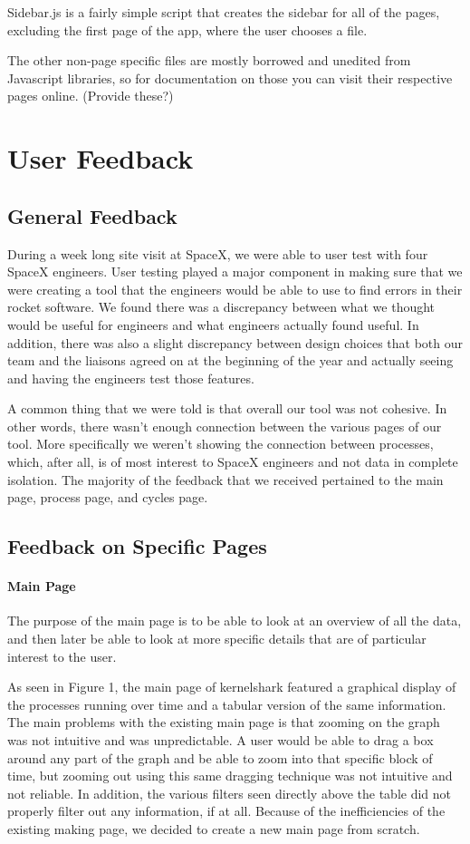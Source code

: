 \documentclass{hmcclinic}
\begin{document}
  Sidebar.js is a fairly simple script that creates the sidebar for all of the
  pages, excluding the first page of the app, where the user chooses a file.

  The other non-page specific files are mostly borrowed and unedited from
  Javascript libraries, so for documentation on those you can visit their
  respective pages online. (Provide these?)

\chapter{User Feedback} %
\section{General Feedback} %
During a week long site visit at SpaceX, we were able to user test with four SpaceX engineers. User testing played a major component in making sure that we were creating a tool that the engineers would be able to use to find errors in their rocket software. We found there was a discrepancy between what we thought would be useful for engineers and what engineers actually found useful. In addition, there was also a slight discrepancy between design choices that both our team and the liaisons agreed on at the beginning of the year and actually seeing and having the engineers test those features.

A common thing that we were told is that overall our tool was not cohesive. In other words, there wasn't enough connection between the various pages of our tool. More specifically we weren't showing the connection between processes, which, after all, is of most interest to SpaceX engineers and not data in complete isolation. The majority of the feedback that we received pertained to the main page, process page, and cycles page.

\section{Feedback on Specific Pages} %

\subsubsection{Main Page}
The purpose of the main page is to be able to look at an overview of all the data, and then later be able to look at more specific details that are of particular interest to the user.

As seen in Figure 1, the main page of kernelshark featured a graphical display of the processes running over time and a tabular version of the same information. The main problems with the existing main page is that zooming on the graph was not intuitive and was unpredictable. A user would be able to drag a box around any part of the graph and be able to zoom into that specific block of time, but zooming out using this same dragging technique was not intuitive and not reliable. In addition, the various filters seen directly above the table did not properly filter out any information, if at all. Because of the inefficiencies of the existing making page, we decided to create a new main page from scratch. 
\end{document}
